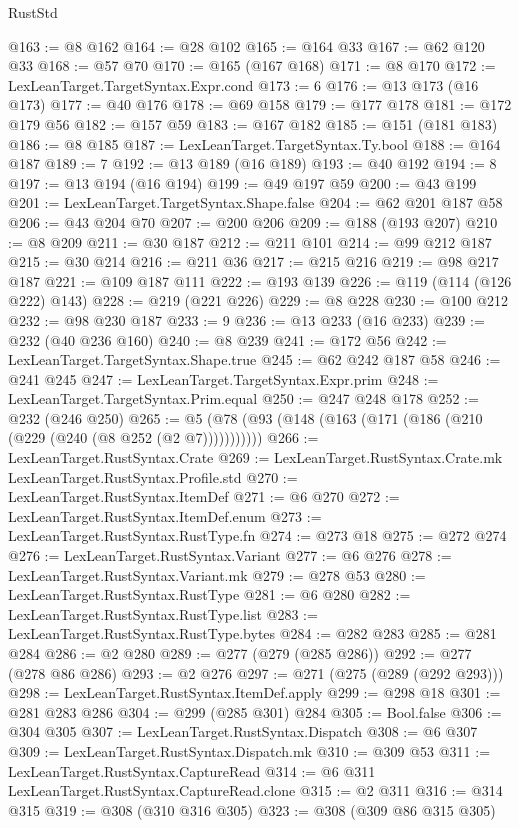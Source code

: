 \begin{lexlean}{RustStd}
\begin{coremodule}
@163 := @8 @162
@164 := @28 @102
@165 := @164 @33
@167 := @62 @120 @33
@168 := @57 @70
@170 := @165 (@167 @168)
@171 := @8 @170
@172 := LexLeanTarget.TargetSyntax.Expr.cond
@173 := 6
@176 := @13 @173 (@16 @173)
@177 := @40 @176
@178 := @69 @158
@179 := @177 @178
@181 := @172 @179 @56
@182 := @157 @59
@183 := @167 @182
@185 := @151 (@181 @183)
@186 := @8 @185
@187 := LexLeanTarget.TargetSyntax.Ty.bool
@188 := @164 @187
@189 := 7
@192 := @13 @189 (@16 @189)
@193 := @40 @192
@194 := 8
@197 := @13 @194 (@16 @194)
@199 := @49 @197 @59
@200 := @43 @199
@201 := LexLeanTarget.TargetSyntax.Shape.false
@204 := @62 @201 @187 @58
@206 := @43 @204 @70
@207 := @200 @206
@209 := @188 (@193 @207)
@210 := @8 @209
@211 := @30 @187
@212 := @211 @101
@214 := @99 @212 @187
@215 := @30 @214
@216 := @211 @36
@217 := @215 @216
@219 := @98 @217 @187
@221 := @109 @187 @111
@222 := @193 @139
@226 := @119 (@114 (@126 @222) @143)
@228 := @219 (@221 @226)
@229 := @8 @228
@230 := @100 @212
@232 := @98 @230 @187
@233 := 9
@236 := @13 @233 (@16 @233)
@239 := @232 (@40 @236 @160)
@240 := @8 @239
@241 := @172 @56
@242 := LexLeanTarget.TargetSyntax.Shape.true
@245 := @62 @242 @187 @58
@246 := @241 @245
@247 := LexLeanTarget.TargetSyntax.Expr.prim
@248 := LexLeanTarget.TargetSyntax.Prim.equal
@250 := @247 @248 @178
@252 := @232 (@246 @250)
@265 := @5 (@78 (@93 (@148 (@163 (@171 (@186 (@210 (@229 (@240 (@8 @252 (@2 @7)))))))))))
@266 := LexLeanTarget.RustSyntax.Crate
@269 := LexLeanTarget.RustSyntax.Crate.mk LexLeanTarget.RustSyntax.Profile.std
@270 := LexLeanTarget.RustSyntax.ItemDef
@271 := @6 @270
@272 := LexLeanTarget.RustSyntax.ItemDef.enum
@273 := LexLeanTarget.RustSyntax.RustType.fn
@274 := @273 @18
@275 := @272 @274
@276 := LexLeanTarget.RustSyntax.Variant
@277 := @6 @276
@278 := LexLeanTarget.RustSyntax.Variant.mk
@279 := @278 @53
@280 := LexLeanTarget.RustSyntax.RustType
@281 := @6 @280
@282 := LexLeanTarget.RustSyntax.RustType.list
@283 := LexLeanTarget.RustSyntax.RustType.bytes
@284 := @282 @283
@285 := @281 @284
@286 := @2 @280
@289 := @277 (@279 (@285 @286))
@292 := @277 (@278 @86 @286)
@293 := @2 @276
@297 := @271 (@275 (@289 (@292 @293)))
@298 := LexLeanTarget.RustSyntax.ItemDef.apply
@299 := @298 @18
@301 := @281 @283 @286
@304 := @299 (@285 @301) @284
@305 := Bool.false
@306 := @304 @305
@307 := LexLeanTarget.RustSyntax.Dispatch
@308 := @6 @307
@309 := LexLeanTarget.RustSyntax.Dispatch.mk
@310 := @309 @53
@311 := LexLeanTarget.RustSyntax.CaptureRead
@314 := @6 @311 LexLeanTarget.RustSyntax.CaptureRead.clone
@315 := @2 @311
@316 := @314 @315
@319 := @308 (@310 @316 @305)
@323 := @308 (@309 @86 @315 @305)

\end{coremodule}
\end{lexlean}
